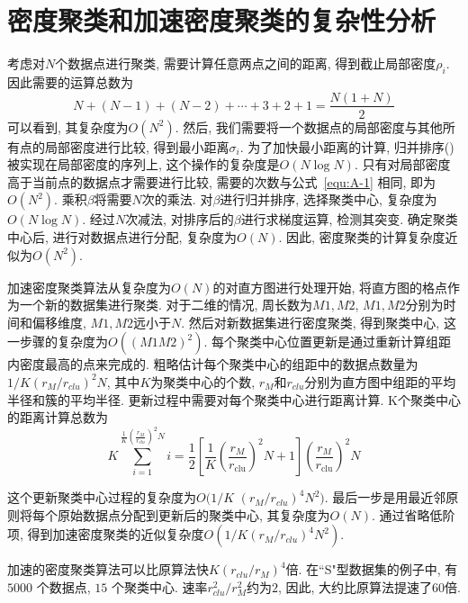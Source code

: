 \section{密度聚类和加速密度聚类的复杂性分析\label{Appendix:A}}
考虑对$N$个数据点进行聚类, 需要计算任意两点之间的距离, 得到截止局部密度$\rho_i$. 因此需要的运算总数为
\begin{equation}
    N+(N-1)+(N-2)+\cdots+3+2+1=\frac{N(1+N)}{2}
    \label{equ:A-1}
\end{equation}
可以看到, 其复杂度为$O(N^2)$. 然后, 我们需要将一个数据点的局部密度与其他所有点的局部密度进行比较, 得到最小距离$\sigma_i$. 为了加快最小距离的计算, 归并排序(\cite{Satish2010})被实现在局部密度的序列上, 这个操作的复杂度是$O(N\log N)$. 只有对局部密度高于当前点的数据点才需要进行比较, 需要的次数与公式~\ref{equ:A-1} 相同, 即为$O(N^2)$. 乘积$\beta$将需要$N$次的乘法. 对$\beta$进行归并排序, 选择聚类中心, 复杂度为$O(N\log N)$. 经过$N$次减法, 对排序后的$\beta$进行求梯度运算, 检测其突变. 确定聚类中心后, 进行对数据点进行分配, 复杂度为$O(N)$. 因此, 密度聚类的计算复杂度近似为$O(N^2)$. 

加速密度聚类算法从复杂度为$O(N)$的对直方图进行处理开始, 将直方图的格点作为一个新的数据集进行聚类. 对于二维的情况, 周长数为$M1,M2$, $M1,M2$分别为时间和偏移维度, $M1, M2$远小于$N$. 然后对新数据集进行密度聚类, 得到聚类中心, 这一步骤的复杂度为$O((M1M2)^2)$. 每个聚类中心位置更新是通过重新计算组距内密度最高的点来完成的. 粗略估计每个聚类中心的组距中的数据点数量为$1/K(r_M/r_{clu})^2N$, 其中$K$为聚类中心的个数, $r_M$和$r_{clu}$分别为直方图中组距的平均半径和簇的平均半径. 更新过程中需要对每个聚类中心进行距离计算. K个聚类中心的距离计算总数为
\begin{equation}
    K \sum_{i=1}^{\frac{1}{K}(\frac{r_M}{r_{clu}})^2N} i=\frac{1}{2}\left[\frac{1}{K}\left(\frac{r_{M}}{r_{\mathrm{clu}}}\right)^{2} N+1\right]\left(\frac{r_{M}}{r_{\mathrm{clu}}}\right)^{2} N
\end{equation}

这个更新聚类中心过程的复杂度为$O(1/K$ $(r_M/r_{clu})^4N^2)$. 最后一步是用最近邻原则将每个原始数据点分配到更新后的聚类中心, 其复杂度为$O(N)$. 通过省略低阶项, 得到加速密度聚类的近似复杂度$O(1/K(r_M/r_{clu})^4N^2)$. 

加速的密度聚类算法可以比原算法快$K(r_{clu}/r_M)^4$倍. 在``S"型数据集的例子中, 有 $5000$ 个数据点, $15$ 个聚类中心. 速率$r_{clu}^2/r_M^2$约为$2$, 因此, 大约比原算法提速了$60$倍. 
